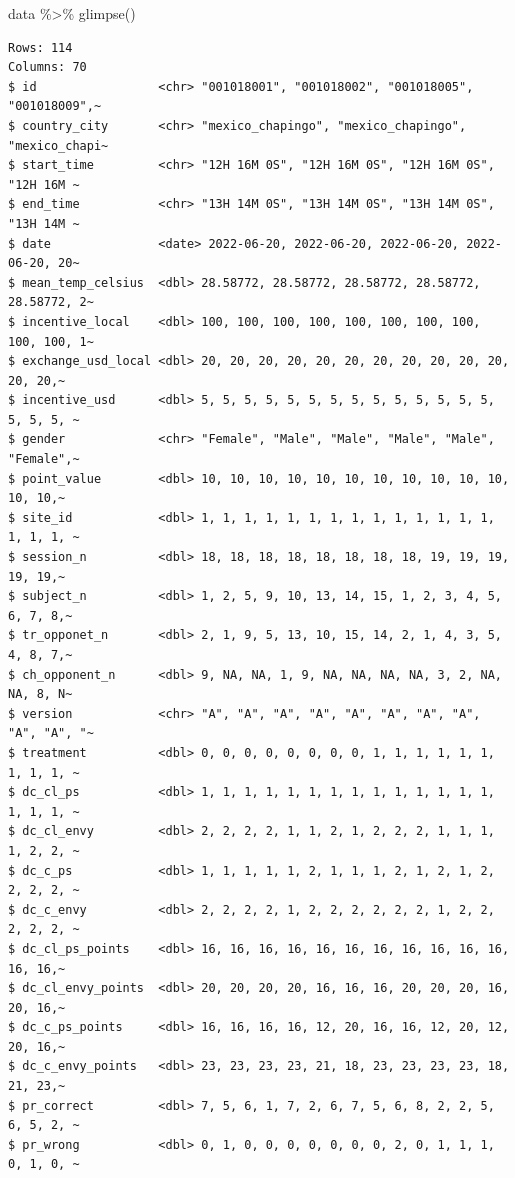 \documentclass[
  letterpaper,
]{book}
\newenvironment{Shaded}{\begin{snugshade}}{\end{snugshade}}
\newcommand{\FunctionTok}[1]{\textcolor[rgb]{0.28,0.35,0.67}{#1}}
\newcommand{\NormalTok}[1]{\textcolor[rgb]{0.00,0.23,0.31}{#1}}
\newcommand{\SpecialCharTok}[1]{\textcolor[rgb]{0.37,0.37,0.37}{#1}}
\begin{document}
\begin{Shaded}
\begin{Highlighting}[]
\NormalTok{data }\SpecialCharTok{\%\textgreater{}\%} \FunctionTok{glimpse}\NormalTok{()}
\end{Highlighting}
\end{Shaded}

\begin{verbatim}
Rows: 114
Columns: 70
$ id                 <chr> "001018001", "001018002", "001018005", "001018009",~
$ country_city       <chr> "mexico_chapingo", "mexico_chapingo", "mexico_chapi~
$ start_time         <chr> "12H 16M 0S", "12H 16M 0S", "12H 16M 0S", "12H 16M ~
$ end_time           <chr> "13H 14M 0S", "13H 14M 0S", "13H 14M 0S", "13H 14M ~
$ date               <date> 2022-06-20, 2022-06-20, 2022-06-20, 2022-06-20, 20~
$ mean_temp_celsius  <dbl> 28.58772, 28.58772, 28.58772, 28.58772, 28.58772, 2~
$ incentive_local    <dbl> 100, 100, 100, 100, 100, 100, 100, 100, 100, 100, 1~
$ exchange_usd_local <dbl> 20, 20, 20, 20, 20, 20, 20, 20, 20, 20, 20, 20, 20,~
$ incentive_usd      <dbl> 5, 5, 5, 5, 5, 5, 5, 5, 5, 5, 5, 5, 5, 5, 5, 5, 5, ~
$ gender             <chr> "Female", "Male", "Male", "Male", "Male", "Female",~
$ point_value        <dbl> 10, 10, 10, 10, 10, 10, 10, 10, 10, 10, 10, 10, 10,~
$ site_id            <dbl> 1, 1, 1, 1, 1, 1, 1, 1, 1, 1, 1, 1, 1, 1, 1, 1, 1, ~
$ session_n          <dbl> 18, 18, 18, 18, 18, 18, 18, 18, 19, 19, 19, 19, 19,~
$ subject_n          <dbl> 1, 2, 5, 9, 10, 13, 14, 15, 1, 2, 3, 4, 5, 6, 7, 8,~
$ tr_opponet_n       <dbl> 2, 1, 9, 5, 13, 10, 15, 14, 2, 1, 4, 3, 5, 4, 8, 7,~
$ ch_opponent_n      <dbl> 9, NA, NA, 1, 9, NA, NA, NA, NA, 3, 2, NA, NA, 8, N~
$ version            <chr> "A", "A", "A", "A", "A", "A", "A", "A", "A", "A", "~
$ treatment          <dbl> 0, 0, 0, 0, 0, 0, 0, 0, 1, 1, 1, 1, 1, 1, 1, 1, 1, ~
$ dc_cl_ps           <dbl> 1, 1, 1, 1, 1, 1, 1, 1, 1, 1, 1, 1, 1, 1, 1, 1, 1, ~
$ dc_cl_envy         <dbl> 2, 2, 2, 2, 1, 1, 2, 1, 2, 2, 2, 1, 1, 1, 1, 2, 2, ~
$ dc_c_ps            <dbl> 1, 1, 1, 1, 1, 2, 1, 1, 1, 2, 1, 2, 1, 2, 2, 2, 2, ~
$ dc_c_envy          <dbl> 2, 2, 2, 2, 1, 2, 2, 2, 2, 2, 2, 1, 2, 2, 2, 2, 2, ~
$ dc_cl_ps_points    <dbl> 16, 16, 16, 16, 16, 16, 16, 16, 16, 16, 16, 16, 16,~
$ dc_cl_envy_points  <dbl> 20, 20, 20, 20, 16, 16, 16, 20, 20, 20, 16, 20, 16,~
$ dc_c_ps_points     <dbl> 16, 16, 16, 16, 12, 20, 16, 16, 12, 20, 12, 20, 16,~
$ dc_c_envy_points   <dbl> 23, 23, 23, 23, 21, 18, 23, 23, 23, 23, 18, 21, 23,~
$ pr_correct         <dbl> 7, 5, 6, 1, 7, 2, 6, 7, 5, 6, 8, 2, 2, 5, 6, 5, 2, ~
$ pr_wrong           <dbl> 0, 1, 0, 0, 0, 0, 0, 0, 0, 2, 0, 1, 1, 1, 0, 1, 0, ~

\end{verbatim}
\end{document}
